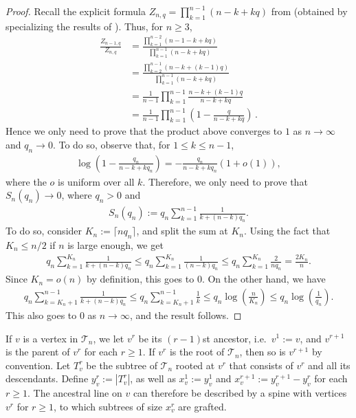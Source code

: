 \documentclass{article}
\theoremstyle{remark}
\newcommand{\abs}[1]{{\left|#1\right|}}
\newcommand{\cT}{\mathcal{T}}
\begin{document}
\begin{proof}
Recall the explicit formula $Z_{n,q} = \prod_{k=1}^{n-1} (n-k+kq)$ from \cite{Thevenin_Wagner_2023} (obtained by specializing the results of \cite{ER86}). 
Thus, for $n \geq 3$,
\begin{align*}
    \frac{Z_{n-1,q}}{Z_{n,q}} &= \frac{\prod_{k=1}^{n-2}(n-1-k+kq)}{\prod_{k=1}^{n-1}(n-k+kq)}\\
    &= \frac{\prod_{k=2}^{n-1}(n-k+(k-1)q)}{\prod_{k=1}^{n-1}(n-k+kq)}\\
    &= \frac{1}{n-1} \prod_{k=1}^{n-1} \frac{n-k+(k-1)q}{n-k+kq}\\
    &= \frac{1}{n-1} \prod_{k=1}^{n-1}\left(1- \frac{q}{n-k+kq}\right) \,.
\end{align*}
Hence we only need to prove that the product above converges to $1$ as $n\to\infty$ and $q_n \to 0$. 
To do so, observe that, for $1 \leq k \leq n-1$,
\begin{align*}
\log \left( 1- \frac{q_n}{n-k+kq_n} \right) =  -\frac{q_n}{n-k+kq_n}(1+o(1)),
\end{align*}
where the $o$ is uniform over all $k$. 
Therefore, we only need to prove that $S_n(q_n) \rightarrow 0$, where $q_n > 0$ and
\begin{align*}
    S_n(q_n) := q_n \sum_{k=1}^{n-1} \frac{1}{k+(n-k)q_n}.
\end{align*}
To do so, consider $K_n := \lceil n q_n \rceil$, and split the sum at $K_n$. 
Using the fact that $K_n \leq n/2$ if $n$ is large enough, we get
\begin{align*}
   q_n \sum_{k=1}^{K_n} \frac{1}{k+(n-k)q_n} 
   \leq q_n \sum_{k=1}^{K_n} \frac{1}{(n-k)q_n}
   \leq q_n \sum_{k=1}^{K_n} \frac{2}{nq_n}
   = \frac{2K_n}{n}.
\end{align*}
Since $K_n =o(n)$ by definition, this goes to $0$. 
On the other hand, we have
\begin{align*}
    q_n \sum_{k=K_n+1}^{n-1} \frac{1}{k+(n-k)q_n} 
    \leq q_n \sum_{k=K_n+1}^{n-1} \frac{1}{k}
    \leq q_n \log\left( \frac{n}{K_n} \right)
    \leq q_n \log \left( \frac{1}{q_n} \right).
\end{align*}
This also goes to $0$ as $n \rightarrow \infty$, and the result follows.
\end{proof}

If $v$ is a vertex in $\cT_n$, we let $v^r$ be its $(r-1)$st ancestor, i.e.~$v^1:=v$, and $v^{r+1}$ is the parent of $v^r$ for each $r\ge1$.
If $v^r$ is the root of $\cT_n$, then so is $v^{r+1}$ by convention.
Let $T_v^r$ be the subtree of $\cT_n$ rooted at $v^r$ that consists of $v^r$ and all its descendants.
Define $y_v^r := \abs{T_v^r}$, as well as $x_v^1 := y_v^1$ and $x_v^{r+1} := y_v^{r+1} - y_v^r$ for each $r\ge1$.
The ancestral line on $v$ can therefore be described by a spine with vertices $v^r$ for $r\ge1$, to which subtrees of size $x_v^r$ are grafted.
\end{document}
